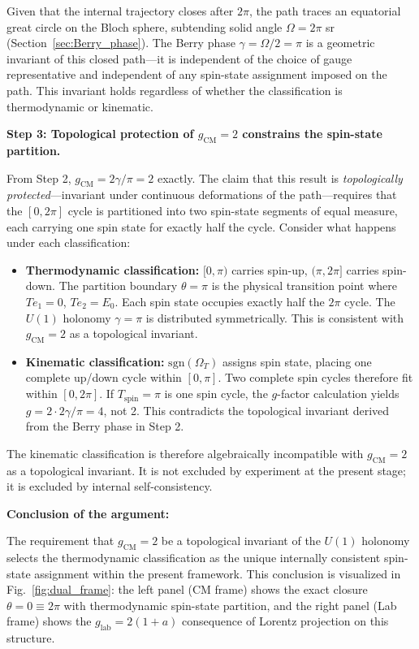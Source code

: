 \documentclass[%
 reprint,
 amsmath,amssymb,
 aps,
 prb,
]{revtex4-2}
\numberwithin{equation}{section}
\theoremstyle{definition}
\theoremstyle{remark}
\begin{document}
Given that the internal trajectory closes after $2\pi$, the path traces an equatorial great circle on the Bloch sphere, subtending solid angle $\Omega = 2\pi$ sr (Section~\ref{sec:Berry_phase}). The Berry phase $\gamma = \Omega/2 = \pi$ is a geometric invariant of this closed path---it is independent of the choice of gauge representative and independent of any spin-state assignment imposed on the path. This invariant holds regardless of whether the classification is thermodynamic or kinematic.

\textbf{Step 3: Topological protection of $g_{\text{CM}} = 2$ constrains the spin-state partition.}

From Step 2, $g_{\text{CM}} = 2\gamma/\pi = 2$ exactly. The claim that this result is \emph{topologically protected}---invariant under continuous deformations of the path---requires that the $[0,2\pi]$ cycle is partitioned into two spin-state segments of equal measure, each carrying one spin state for exactly half the cycle. Consider what happens under each classification:

\begin{itemize}
\item \textbf{Thermodynamic classification:} $[0,\pi)$ carries spin-up, $(\pi, 2\pi]$ carries spin-down. The partition boundary $\theta = \pi$ is the physical transition point where $Te_1 = 0$, $Te_2 = E_0$. Each spin state occupies exactly half the $2\pi$ cycle. The $U(1)$ holonomy $\gamma = \pi$ is distributed symmetrically. This is consistent with $g_{\text{CM}} = 2$ as a topological invariant.

\item \textbf{Kinematic classification:} $\mathrm{sgn}(\Omega_T)$ assigns spin state, placing one complete up/down cycle within $[0,\pi]$. Two complete spin cycles therefore fit within $[0,2\pi]$. If $T_{\text{spin}} = \pi$ is one spin cycle, the $g$-factor calculation yields $g = 2 \cdot 2\gamma/\pi = 4$, not 2. This contradicts the topological invariant derived from the Berry phase in Step 2.
\end{itemize}

The kinematic classification is therefore algebraically incompatible with $g_{\text{CM}} = 2$ as a topological invariant. It is not excluded by experiment at the present stage; it is excluded by internal self-consistency.

\textbf{Conclusion of the argument:}

The requirement that $g_{\text{CM}} = 2$ be a topological invariant of the $U(1)$ holonomy selects the thermodynamic classification as the unique internally consistent spin-state assignment within the present framework. This conclusion is visualized in Fig.~\ref{fig:dual_frame}: the left panel (CM frame) shows the exact closure $\theta = 0 \equiv 2\pi$ with thermodynamic spin-state partition, and the right panel (Lab frame) shows the $g_{\text{lab}} = 2(1+a)$ consequence of Lorentz projection on this structure.
\end{document}
